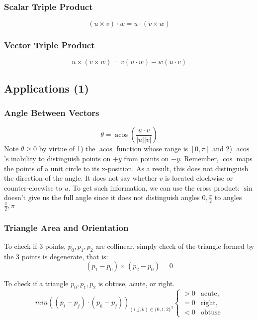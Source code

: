 \documentclass[12pt]{report}
\DeclareMathOperator{\acos}{acos}
\begin{document}
\subsubsection{Scalar Triple Product}
$$(u \times v) \cdot w = u \cdot (v \times w)$$
\subsubsection{Vector Triple Product}
$$u \times (v \times w) = v(u \cdot w) - w(u \cdot v)$$
\subsection{Applications (1)}
	\subsubsection{Angle Between Vectors}
	$$
	\theta = \acos\left(\frac{u \cdot v}{|u||v|}\right)
	$$
	Note $\theta \geq 0$ by virtue of 1) the $\acos$ function whose range is $[0, \pi]$ and 2) $\acos$'s inability to distinguish points on $+y$ from points on $-y$. Remember, $\cos$ maps the points of a unit circle to its x-position. As a result, this does not distinguish the direction of the angle. It does not say whether $v$ is located clockwise or counter-clocwise to $u$. To get such information, we can use the cross product:
	$\sin$ doesn't give us the full angle since it does not distinguish angles $0, \frac{\pi}{2}$ to angles $\frac{\pi}{2}, \pi$
	
	\subsubsection{Triangle Area and Orientation}
	
	To check if 3 points, ${p_0, p_1, p_2}$ are collinear, simply check of the triangle formed by the 3 points is degenerate, that is:
	$$
	(p_1-p_0)\times (p_2-p_0) = 0
	$$
	
	To check if a triangle ${p_0, p_1, p_2}$ is obtuse, acute, or right.
	$$
	min((p_i - p_j) \cdot (p_k - p_j))_{ (i,j,k) \in \{0,1,2\}^3}
	\begin{cases}
            > 0 &\text{acute},\\
            = 0 & \text{right}, \\
            < 0 & \text{obtuse}
        \end{cases}
	$$
	
\end{document}
